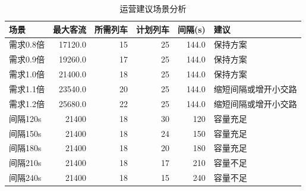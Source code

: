 \begin{table}[H]
\centering
\caption{运营建议场景分析}
\label{tab:rail-scenario-analysis}
\small
\begin{tabular}{lrrrrl}
\toprule
场景 & 最大客流 & 所需列车 & 计划列车 & 间隔(s) & 建议 \\
\midrule
需求0.8倍 & 17120.0 & 15 & 25 & 144.0 & 保持方案 \\
需求0.9倍 & 19260.0 & 17 & 25 & 144.0 & 保持方案 \\
需求1.0倍 & 21400.0 & 18 & 25 & 144.0 & 保持方案 \\
需求1.1倍 & 23540.0 & 20 & 25 & 144.0 & 缩短间隔或增开小交路 \\
需求1.2倍 & 25680.0 & 22 & 25 & 144.0 & 缩短间隔或增开小交路 \\
间隔120s & 21400 & 18 & 30 & 120 & 容量充足 \\
间隔150s & 21400 & 18 & 24 & 150 & 容量充足 \\
间隔180s & 21400 & 18 & 20 & 180 & 容量充足 \\
间隔210s & 21400 & 18 & 17 & 210 & 容量不足 \\
间隔240s & 21400 & 18 & 15 & 240 & 容量不足 \\
\bottomrule
\end{tabular}
\end{table}
